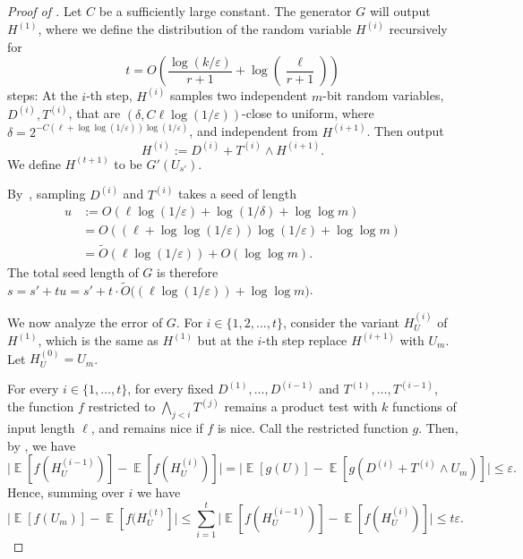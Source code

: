 \documentclass{toc}
\def\eps{\varepsilon}
\def\Blocklength{\ell}
\DeclareMathOperator*{\E}{\mathbb{E}}                 %
\begin{document}
	\begin{proof}[Proof of {}]
    Let $C$ be a sufficiently large constant.
    The generator $G$ will output $H^{(1)}$, where we define the distribution of the random variable $H^{(i)}$ recursively
    for
    \[
      t = O \left( \frac{\log(k/\eps)}{r+1} + \log\left(\frac{\Blocklength}{r+1}\right) \right)
    \]
    steps:
    At the $i$-th step, $H^{(i)}$ samples two independent 
    $m$-bit  %
    random variables, $D^{(i)}, T^{(i)}$, %
    that are
    $(\delta, C \Blocklength \log(1/\eps))$-close to uniform, where 
$\delta = 2^{-C(\Blocklength + \log\log(1/\eps)) \log(1/\eps)}$,
    and independent from $H^{(i+1)}$.  %
    Then output 
		\[
			H^{(i)} := D^{(i)} + T^{(i)} \wedge H^{(i+1)} .
		\]
		We define $H^{(t+1)}$ to be $G'(U_{s'})$.

    By~\cite[Lemma~4.2]{NaorN93}, sampling $D^{(i)}$ and $T^{(i)}$ takes a seed of length 
    \begin{align*}
      u
      &:= O(\Blocklength \log(1/\eps) + \log(1/\delta) + \log\log m) \\
      &= O((\Blocklength + \log\log(1/\eps)) \log(1/\eps) + \log\log m) \\
      &= \tilde O(\Blocklength \log(1/\eps)) + O(\log\log m).
    \end{align*}
    The total seed length of $G$ is therefore $s = s' + tu = s' + t \cdot \tilde O\bigl( (\Blocklength \log(1/\eps)) + \log\log m \bigr)$.

    We now analyze the error of $G$.
    For $i \in \{1, 2, \ldots, t\}$, consider the variant $H^{(i)}_U$ of $H^{(1)}$, which is the same as $H^{(1)}$ but at the $i$-th step replace $H^{(i+1)}$ with $U_m$.
    Let $H^{(0)}_U = U_m$.

    For every $i \in \{1, \ldots, t\}$, for every fixed $D^{(1)}, \ldots, D^{(i-1)}$ and $T^{(1)}, \ldots, T^{(i-1)}$, the function $f$ restricted to 
    $\bigwedge_{j < i} T^{(j)}$ 
    remains a product test with $k$ functions of input length $\Blocklength$, and remains nice if $f$ is nice.  Call the restricted function $g$.
    Then, by , we have
    \[
      \bigl| \E[f(H_U^{(i-1)})] - \E[f(H_U^{(i)})] \bigr|
      = \bigl| \E[g(U)] - \E[g(D^{(i)} + T^{(i)} \wedge U_m)] \bigr|
			\le \eps .
    \]
		Hence, summing over $i$ we have
		\[
			\bigl| \E[f(U_m)] - \E[f(H_U^{(t)}] \bigr|
			\le \sum_{i=1}^{t} \bigl| \E[f(H_U^{(i-1)})] - \E[f(H_U^{(i)})] \bigr|
			\le t \eps.
		\]


\end{proof}
\end{document}
